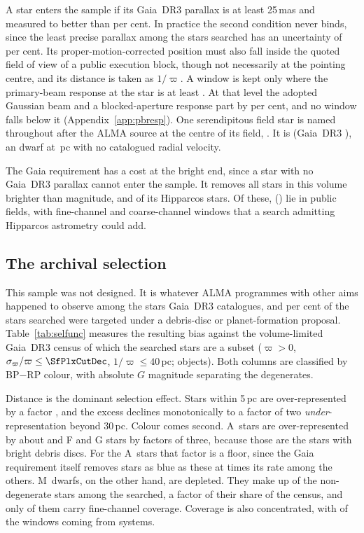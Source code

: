 A star enters the sample if its Gaia~DR3 parallax is at least 25\,mas and
measured to better than \PlxAdqlPct{} per cent. In practice the second
condition never binds, since the least precise parallax among the stars
searched has an uncertainty of \SfPlxWorstPct{} per cent.
Its proper-motion-corrected position must also fall inside the quoted field
of view of a public execution block, though not necessarily at the pointing
centre, and its distance is taken as $1/\varpi$. A window is kept only where
the primary-beam response at the star is at least \BmFloorResp. At that level
the adopted Gaussian beam and a blocked-aperture response part by
\BmFloorTolPct{} per cent, and no window falls below it
(Appendix~\ref{app:pbresp}). One serendipitous field star is named throughout
after the ALMA source at the centre of its field, \BkAlmaName. It is
\BkAlmaTwoMass{} (Gaia~DR3 \BkAlmaGaia), an \BkAlmaSpType{} dwarf at
\BkAlmaDistPc\,pc with no catalogued radial velocity.

The Gaia requirement has a cost at the bright end, since a star with no
Gaia~DR3 parallax cannot enter the sample. It removes all \BsNBright{} stars
in this volume brighter than \BsBrightMag{} magnitude, and \BsNGap{} of its
\BsNVol{} Hipparcos stars. Of these, \BsNAlmaWord{} (\BsStarList) lie in
public fields, with \BsNWinA{} fine-channel and \BsNWinB{} coarse-channel
windows that a search admitting Hipparcos astrometry could add.


\subsection{The archival selection}
\label{sec:bias}

This sample was not designed. It is whatever ALMA programmes with other aims
happened to observe among the stars Gaia~DR3 catalogues, and
\PctDiscProposal{} per cent of the stars searched were targeted under a
debris-disc or planet-formation proposal. Table~\ref{tab:selfunc} measures the
resulting bias against the volume-limited Gaia~DR3 census of which the
searched stars are a subset ($\varpi>0$, $\sigma_\varpi/\varpi\le\SfPlxCutDec$,
$1/\varpi\le40$\,pc; \SfCensusN{} objects). Both columns are classified by
BP$-$RP colour, with absolute $G$ magnitude separating the degenerates.

Distance is the dominant selection effect. Stars within 5\,pc are
over-represented by a factor \SfTopRatio, and the excess declines
monotonically to a factor of two \emph{under}-representation beyond 30\,pc. Colour comes
second. A~stars are over-represented by about \SfARatio{} and F and G stars
by factors of three, because those are the stars with bright debris discs.
For the A~stars that factor is a floor, since the Gaia requirement
itself removes stars as blue as these at \BsEarlyRatio{} times its rate among
the others. M~dwarfs, on the other hand, are depleted. They make up
\SfMSearched{} of the \SfNMain{} non-degenerate stars among the \SfNStar{}
searched, a factor \SfMRatio{} of their share of the census, and only
\SfMClassAStars{} of them carry fine-channel coverage. Coverage is also concentrated, with
\ConcThreeWin{} of the \NWindows{} windows coming from \ConcThreeSys{}
systems.

